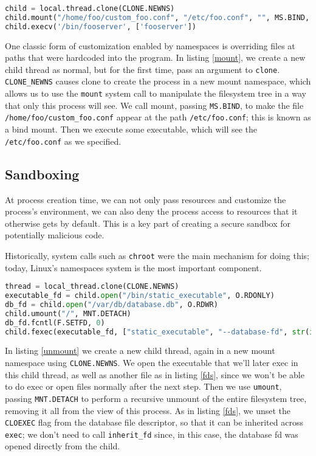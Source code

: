 \documentclass[sigplan]{acmart}
\begin{document}
\begin{lstlisting}[float=*,language=Python,label={mount},caption={Overriding absolute path using a mount namespace}]
child = local.thread.clone(CLONE.NEWNS)
child.mount("/home/foo/custom_foo.conf", "/etc/foo.conf", "", MS.BIND, "")
child.execv('/bin/fooserver', ['fooserver'])
\end{lstlisting}
One classic form of customization enabled by namespaces
is overriding files at paths that were hardcoded into the program.
In listing \ref{mount},
we create a new child thread as normal,
but for the first time,
pass an argument to \texttt{clone}.
\verb|CLONE_NEWNS| causes clone to create the process in a new mount namespace,
which allows us to use the \texttt{mount} system call
to manipulate the filesystem tree in a way that only this process will see.
We call mount, passing \texttt{MS.BIND}, to make the file \verb|/home/foo/custom_foo.conf|
appear at the path \verb|/etc/foo.conf|;
this is known as a bind mount.
Then we execute some executable,
which will see the \verb|/etc/foo.conf| as we specified.
\subsection{Sandboxing}
At process creation time,
we can not only pass resources and customize the process's environment,
we can also deny the process access to resources that it otherwise gets by default.
This is a key part of creating a secure sandbox for potentially malicious code.

Historically, system calls such as \texttt{chroot} were the main mechanism for doing this;
today, Linux's namespaces system is the most important component.

\begin{lstlisting}[float=*,language=Python,label={unmount},caption={Unmount all and run executable via fexec}]
thread = local_thread.clone(CLONE.NEWNS)
executable_fd = child.open("/bin/static_executable", O.RDONLY)
db_fd = child.open("/var/db/database.db", O.RDWR)
child.umount("/", MNT.DETACH)
db_fd.fcntl(F.SETFD, 0)
child.fexec(executable_fd, ["static_executable", "--database-fd", str(int(db_fd))])
\end{lstlisting}
In listing \ref{unmount}
we create a new child thread,
again in a new mount namespace using \texttt{CLONE.NEWNS}.
We open the executable that we'll later exec in this child thread,
as well as another file as in listing \ref{fds},
since we won't be able to do exec or open files normally after the next step.
Then we use \texttt{umount},
passing \texttt{MNT.DETACH} to perform a recursive unmount of the entire filesystem tree,
removing it all from the view of this process.
As in listing \ref{fds}, we unset the \texttt{CLOEXEC} flag from the database file descriptor,
so that it can be inherited across \texttt{exec};
we don't need to call \verb|inherit_fd| since, in this case, the database fd was opened directly from the child.
\end{document}
